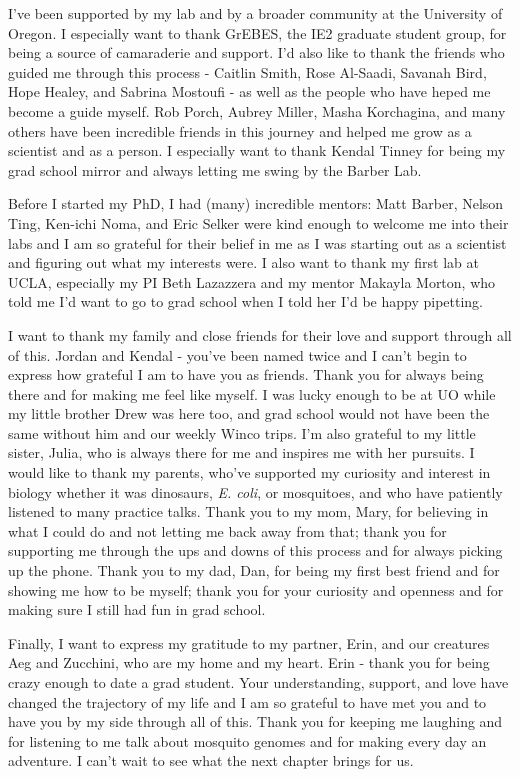 {I've been supported by my lab and by a broader community at the University of Oregon. I especially want to thank 
GrEBES, the IE2 graduate student group, for being a source of camaraderie and support.
I'd also like to thank the friends who guided me through this process - 
Caitlin Smith, Rose Al-Saadi, Savanah Bird, Hope Healey, and Sabrina Mostoufi -
as well as the people who have heped me become a guide myself. 
Rob Porch, Aubrey Miller, Masha Korchagina, and many others have been incredible friends in this journey and helped me grow as a 
scientist and as a person. I especially want to thank Kendal Tinney for being my grad school mirror and always letting me 
swing by the Barber Lab.

Before I started my PhD, I had (many) incredible mentors: Matt Barber, Nelson Ting, Ken-ichi Noma, and Eric Selker 
were kind enough to welcome me into their labs and I am so grateful for their belief in me as I was starting out 
as a scientist and figuring out what my interests were.
I also want to thank my first lab at UCLA, especially my PI Beth Lazazzera and my mentor Makayla Morton, who told me I'd want to go to 
grad school when I told her I'd be happy pipetting.

I want to thank my family and close friends for their love and support through all of this.
Jordan and Kendal - you've been named twice and I can't begin to express how grateful I am to have you as friends.
Thank you for always being there and for making me feel like myself.
I was lucky enough to be at UO while my little brother Drew was here too, and grad school would not have been the same without him 
and our weekly Winco trips. I'm also grateful to my little sister, Julia, who is always there for me and inspires me with her pursuits.
I would like to thank my parents, who've supported my curiosity and interest in biology whether it was dinosaurs, 
\textit{E. coli}, or mosquitoes, and who have patiently listened to many practice talks.
Thank you to my mom, Mary, for believing in what I could do and not letting me back away from that; thank you for 
supporting me through the ups and downs of this process and for always picking up the phone.
Thank you to my dad, Dan, for being my first best friend and for showing me how to be myself; thank you for 
your curiosity and openness and for making sure I still had fun in grad school.

Finally, I want to express my gratitude to my partner, Erin, and our creatures Aeg and Zucchini, 
who are my home and my heart.
Erin - thank you for being crazy enough to date a grad student. Your understanding, support, and love have 
changed the trajectory of my life and I am so grateful to have met you and to have you by my side through all of this.
Thank you for keeping me laughing and for listening to me talk about mosquito genomes and for 
making every day an adventure.
I can't wait to see what the next chapter brings for us.
}

